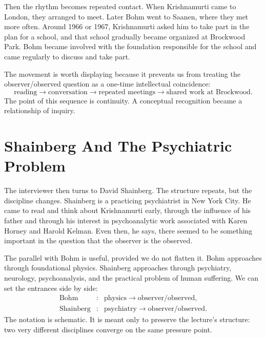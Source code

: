 Then the rhythm becomes repeated contact. When Krishnamurti came to London, they arranged to meet. Later Bohm went to Saanen, where they met more often. Around 1966 or 1967, Krishnamurti asked him to take part in the plan for a school, and that school gradually became organized at Brockwood Park. Bohm became involved with the foundation responsible for the school and came regularly to discuss and take part.

The movement is worth displaying because it prevents us from treating the observer/observed question as a one-time intellectual coincidence:
\begin{equation}
\text{reading}
\longrightarrow
\text{conversation}
\longrightarrow
\text{repeated meetings}
\longrightarrow
\text{shared work at Brockwood}.
\end{equation}
The point of this sequence is continuity. A conceptual recognition became a relationship of inquiry.

\section{Shainberg And The Psychiatric Problem}

The interviewer then turns to David Shainberg. The structure repeats, but the discipline changes. Shainberg is a practicing psychiatrist in New York City. He came to read and think about Krishnamurti early, through the influence of his father and through his interest in psychoanalytic work associated with Karen Horney and Harold Kelman. Even then, he says, there seemed to be something important in the question that the observer is the observed.

The parallel with Bohm is useful, provided we do not flatten it. Bohm approaches through foundational physics. Shainberg approaches through psychiatry, neurology, psychoanalysis, and the practical problem of human suffering. We can set the entrances side by side:
\begin{equation}
\begin{array}{ccl}
\text{Bohm} &:& \text{physics} \longrightarrow \text{observer/observed},\\
\text{Shainberg} &:& \text{psychiatry} \longrightarrow \text{observer/observed}.
\end{array}
\end{equation}
The notation is schematic. It is meant only to preserve the lecture's structure: two very different disciplines converge on the same pressure point.

